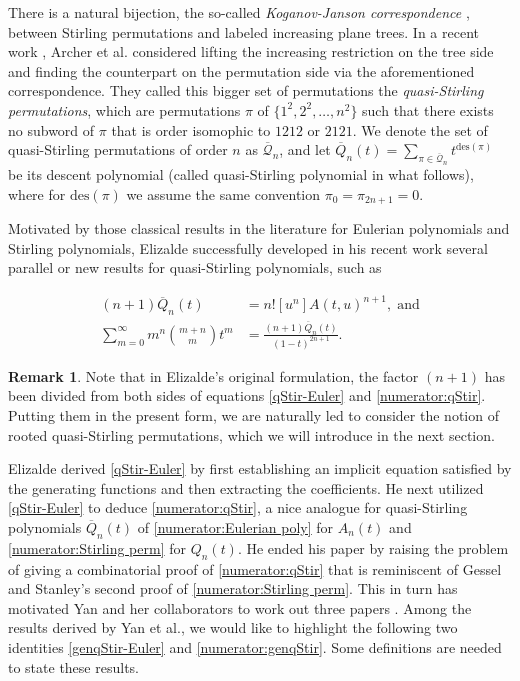 \documentclass[11pt,reqno]{amsart}
\numberwithin{equation}{section}
\theoremstyle{plain}
\theoremstyle{definition}
\newtheorem{remark}{Remark}
\newcommand{\bQ}{\overline{\mathcal{Q}}}
\def\des{\mathrm{des}}
\begin{document}
There is a natural bijection, the so-called {\em Koganov-Janson correspondence} \cite{Kog,Jan,Eli}, between Stirling permutations and labeled increasing plane trees. In a recent work \cite{AGPS}, Archer et al. considered lifting the increasing restriction on the tree side and finding the counterpart on the permutation side via the aforementioned correspondence. They called this bigger set of permutations the {\em quasi-Stirling permutations}, which are permutations $\pi$ of $\{1^2,2^2,\ldots,n^2\}$ such that there exists no subword of $\pi$ that is order isomophic to $1212$ or $2121$. We denote the set of quasi-Stirling permutations of order $n$ as $\bQ_n$, and let $\overline{Q}_n(t)=\sum_{\pi\in\bQ_n}t^{\des(\pi)}$ be its descent polynomial (called quasi-Stirling polynomial in what follows), where for $\des(\pi)$ we assume the same convention $\pi_0=\pi_{2n+1}=0$.

Motivated by those classical results in the literature for Eulerian polynomials and Stirling polynomials, Elizalde successfully developed in his recent work \cite{Eli} several parallel or new results for quasi-Stirling polynomials, such as

\begin{align}\label{qStir-Euler}
(n+1)\overline{Q}_n(t) &= n![u^n]A(t,u)^{n+1},\; \text{and}\\
\label{numerator:qStir}
\sum_{m=0}^{\infty}m^n\binom{m+n}{m}t^m &= \frac{(n+1)\overline{Q}_n(t)}{(1-t)^{2n+1}}.
\end{align}

\begin{remark}
Note that in Elizalde's original formulation, the factor $(n+1)$ has been divided from both sides of equations \eqref{qStir-Euler} and \eqref{numerator:qStir}. Putting them in the present form, we are naturally led to consider the notion of rooted quasi-Stirling permutations, which we will introduce in the next section.
\end{remark}

Elizalde derived \eqref{qStir-Euler} by first establishing an implicit equation satisfied by the generating functions and then extracting the coefficients. He next utilized \eqref{qStir-Euler} to deduce \eqref{numerator:qStir}, a nice analogue for quasi-Stirling polynomials $\overline{Q}_n(t)$ of \eqref{numerator:Eulerian poly} for $A_n(t)$ and \eqref{numerator:Stirling perm} for $Q_n(t)$. He ended his paper \cite{Eli} by raising the problem of giving a combinatorial proof of \eqref{numerator:qStir} that is reminiscent of Gessel and Stanley's second proof of \eqref{numerator:Stirling perm}. This in turn
has motivated Yan and her collaborators to work out three papers \cite{YZ,YYHZ,YHY}. Among the results derived by Yan et al., we would like to highlight the following two identities \eqref{genqStir-Euler} and \eqref{numerator:genqStir}. Some definitions are needed to state these results.
\end{document}
